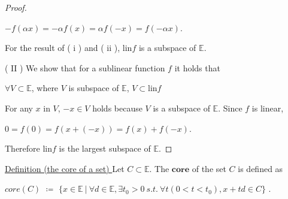 \documentclass[a4paper,11pt]{jsarticle}
\begin{document}
\begin{proof}
  \begin{center}
    $-f(\alpha x) = - \alpha f(x) = \alpha f(-x) = f(- \alpha x)$.
  \end{center}

  For the result of ( $\mathrm{i}$ ) and ( $\mathrm{ii}$ ), $\text{lin}f$ is a subspace of $\mathbb{E}$.

  ( $\mathrm{II}$ ) We show that for a sublinear function $f$ it holds that

  \begin{center}
    $\forall V \subset \mathbb{E}$, where $V$ is subspace of $\mathbb{E}$, $V \subset \text{lin}f$
  \end{center}

  For any $x$ in $V$, $-x \in V$ holds because $V$ is a subspace of $\mathbb{E}$. Since $f$ is linear,

  \begin{center}
    $0 = f(0) = f(x + (-x)) = f(x) + f(-x)$.
  \end{center}

  Therefore $\text{lin}f$ is the largest subspace of $\mathbb{E}$.
\end{proof}

\begin{center}
\end{center}

\begin{itembox}[l]{\underline{Definition (the core of a set) }}
  Let $C \subset \mathbb{E}$. The $\textbf{core}$ of the set $C$ is defined as

  \begin{center}
    $core (C)$ $\coloneqq$ $\{x \in \mathbb{E} \:|\: \forall d \in \mathbb{E}, \exists t_0 > 0 \:s.t.\: \forall t (0<t<t_0), x+td \in C \}$ .
  \end{center}
\end{itembox}
\end{document}
